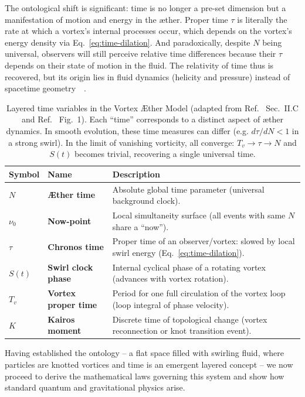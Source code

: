 \documentclass[preprint]{revtex4-2}
\begin{document}
    The ontological shift is significant: time is no longer a pre-set dimension but a manifestation of motion and energy in the æther. Proper time $\tau$ is literally the rate at which a vortex’s internal processes occur, which depends on the vortex’s energy density via Eq.~\eqref{eq:time-dilation}. And paradoxically, despite $N$ being universal, observers will still perceive relative time differences because their $\tau$ depends on their state of motion in the fluid. The relativity of time thus is recovered, but its origin lies in fluid dynamics (helicity and pressure) instead of spacetime geometry~\cite{reference_55}~\cite{reference_56}.

    \begin{table}[t]\centering
    \begin{tabular}{llp{8cm}}
        \hline
        Symbol & Name & Description \\
        \hline
        $N$ & \textbf{Æther time} & Absolute global time parameter (universal background clock). \\[6pt]
        $\nu_0$ & \textbf{Now-point} & Local simultaneity surface (all events with same $N$ share a ``now''). \\[6pt]
        $\tau$ & \textbf{Chronos time} & Proper time of an observer/vortex: slowed by local swirl energy (Eq.~\ref{eq:time-dilation}). \\[6pt]
        $S(t)$ & \textbf{Swirl clock phase} & Internal cyclical phase of a rotating vortex (advances with vortex rotation). \\[6pt]
        $T_v$ & \textbf{Vortex proper time} & Period for one full circulation of the vortex loop (loop integral of phase velocity). \\[6pt]
        $K$ & \textbf{Kairos moment} & Discrete time of topological change (vortex reconnection or knot transition event). \\
        \hline
    \end{tabular}
    \caption{Layered time variables in the Vortex Æther Model (adapted from Ref.~\cite{reference_0} Sec.~II.C and Ref.~\cite{reference_0} Fig.~1). Each ``time'' corresponds to a distinct aspect of æther dynamics. In smooth evolution, these time measures can differ (e.g. $d\tau/dN < 1$ in a strong swirl). In the limit of vanishing vorticity, all converge: $T_v \to \tau \to N$ and $S(t)$ becomes trivial, recovering a single universal time.}
    \label{tab:times}
    \end{table}

    Having established the ontology -- a flat space filled with swirling fluid, where particles are knotted vortices and time is an emergent layered concept -- we now proceed to derive the mathematical laws governing this system and show how standard quantum and gravitational physics arise.
\end{document}
